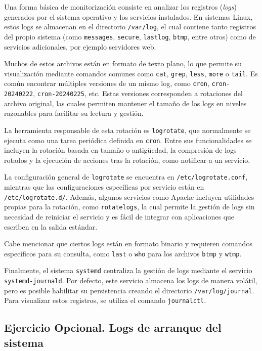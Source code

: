 Una forma básica de monitorización consiste en analizar los registros (\textit{logs}) generados por el sistema operativo y los servicios instalados. En sistemas Linux, estos logs se almacenan en el directorio \texttt{/var/log}, el cual contiene tanto registros del propio sistema (como \texttt{messages}, \texttt{secure}, \texttt{lastlog}, \texttt{btmp}, entre otros) como de servicios adicionales, por ejemplo servidores web.

Muchos de estos archivos están en formato de texto plano, lo que permite su visualización mediante comandos comunes como \texttt{cat}, \texttt{grep}, \texttt{less}, \texttt{more} o \texttt{tail}. Es común encontrar múltiples versiones de un mismo log, como \texttt{cron}, \texttt{cron-20240222}, \texttt{cron-20240225}, etc. Estas versiones corresponden a rotaciones del archivo original, las cuales permiten mantener el tamaño de los logs en niveles razonables para facilitar su lectura y gestión.

La herramienta responsable de esta rotación es \texttt{logrotate}, que normalmente se ejecuta como una tarea periódica definida en \texttt{cron}. Entre sus funcionalidades se incluyen la rotación basada en tamaño o antigüedad, la compresión de logs rotados y la ejecución de acciones tras la rotación, como notificar a un servicio.

La configuración general de \texttt{logrotate} se encuentra en \texttt{/etc/logrotate.conf}, mientras que las configuraciones específicas por servicio están en \texttt{/etc/logrotate.d/}. Además, algunos servicios como Apache incluyen utilidades propias para la rotación, como \texttt{rotatelogs}, la cual permite la gestión de logs sin necesidad de reiniciar el servicio y es fácil de integrar con aplicaciones que escriben en la salida estándar.

Cabe mencionar que ciertos logs están en formato binario y requieren comandos específicos para su consulta, como \texttt{last} o \texttt{who} para los archivos \texttt{btmp} y \texttt{wtmp}.

Finalmente, el sistema \texttt{systemd} centraliza la gestión de logs mediante el servicio \texttt{systemd-journald}. Por defecto, este servicio almacena los logs de manera volátil, pero es posible habilitar su persistencia creando el directorio \texttt{/var/log/journal}. Para visualizar estos registros, se utiliza el comando \texttt{journalctl}.

\subsection{Ejercicio Opcional. Logs de arranque del sistema}


